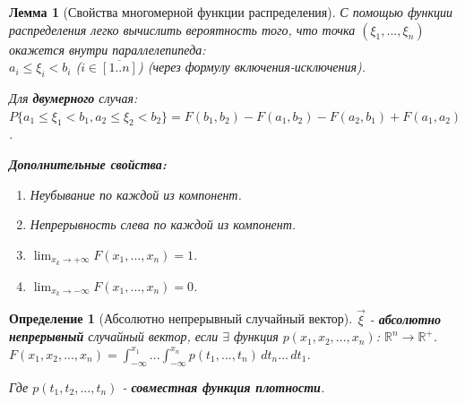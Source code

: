 \documentclass[14pt]{extarticle}
\theoremstyle{breakstyle}
\newtheorem{definition}{Определение}[subsection]
\newtheorem{lemma}{Лемма}[subsection]
\begin{document}
\begin{lemma}[Свойства многомерной функции распределения]

С помощью функции распределения легко вычислить вероятность того, что точка $(\xi_{1}, ..., \xi_{n})$ окажется внутри параллелепипеда:\\
$a_{i} \leq \xi_{i} < b_{i}$ ($i \in \overline{[1..n]}$) (через формулу включения-исключения).

\vspace{\baselineskip}

Для \textbf{двумерного} случая:\\
$P\{a_{1} \leq \xi_{1} < b_{1}, a_{2} \leq \xi_{2} < b_{2}\} = F(b_{1}, b_{2}) - F(a_{1}, b_{2}) - F(a_{2}, b_{1}) + F(a_{1}, a_{2})$.

\vspace{\baselineskip}

\textbf{Дополнительные свойства:}
\begin{enumerate}
    \item Неубывание по каждой из компонент.
    \item Непрерывность слева по каждой из компонент.
    \item $\lim_{x_{k} \to +\infty} F(x_{1}, ..., x_{n}) = 1$.
    \item $\lim_{x_{k} \to -\infty} F(x_{1}, ..., x_{n}) = 0$.
\end{enumerate}

\end{lemma}

\begin{definition}[Абсолютно непрерывный случайный вектор]

$\vec{\xi}$ - \textbf{абсолютно непрерывный} случайный вектор, если $\exists$ функция $p(x_{1}, x_{2}, ..., x_{n})$: $\mathbb{R}^{n} \rightarrow \mathbb{R}^{+}$. \\
$F(x_1, x_2, ..., x_n) = \int_{-\infty}^{x_1} ... \int_{-\infty}^{x_n} p(t_1, ..., t_n) \, dt_n ... \, dt_1$.

\vspace{\baselineskip}

Где $p(t_1, t_2, ..., t_n)$ - \textbf{совместная функция плотности}.

\end{definition}
\end{document}
